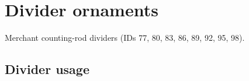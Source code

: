\chapter{Divider ornaments}

Merchant counting-rod dividers (IDs 77, 80, 83, 86, 89, 92, 95, 98).


\section{Divider usage}

\begin{center}
\end{center}

